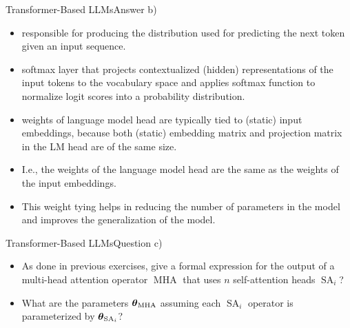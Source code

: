 \documentclass[t]{beamer}
\newcommand\op[1]{\operatorname{#1}}
\begin{document}
\begin{frame}{Transformer-Based LLMs}{Answer b)}
    \begin{itemize}
        \item {} responsible for producing the distribution
              used for predicting the next token given an input sequence.
        \item {} softmax layer that projects
              contextualized (hidden) representations of the input tokens to
              the vocabulary space and applies softmax function to normalize
              logit scores into a probability distribution.
        \item {} weights of language model head are typically
              tied to (static) input embeddings, because both (static) embedding
              matrix and projection matrix in the LM head are of the same size.
        \item I.e., the weights of the language model head are the
              same as the weights of the input embeddings.
        \item This weight tying helps in reducing the number of parameters in
              the model and improves the generalization of the model.
    \end{itemize}
\end{frame}

\begin{frame}{Transformer-Based LLMs}{Question c)}
    \begin{itemize}
        \item As done in previous exercises, give a formal expression for the
              output of a multi-head attention operator $\op{MHA}$ that uses $n$
              self-attention heads $\op{SA}_i$?
        \item What are the parameters $\vtheta_{\op{MHA}}$ assuming each
              $\op{SA}_i$ operator is parameterized by $\vtheta_{\op{SA}_i}$?
    \end{itemize}
\end{frame}
\end{document}
